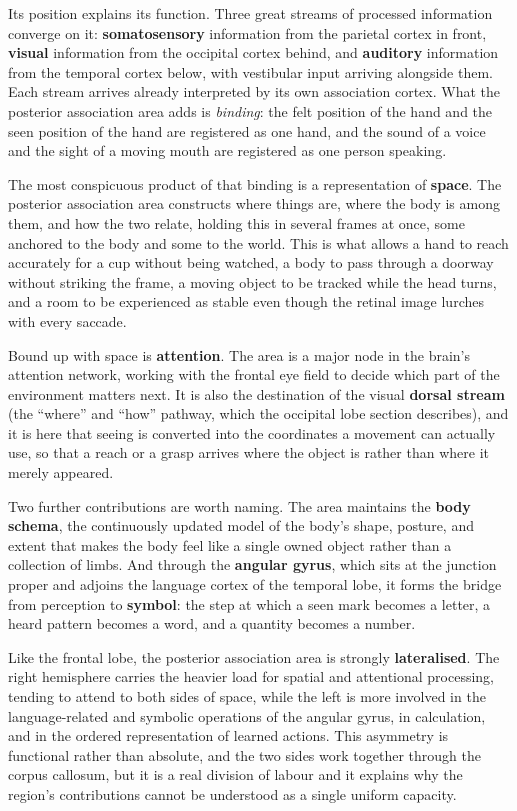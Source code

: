 \documentclass[11pt]{article}
\begin{document}
Its position explains its function. Three great streams of processed information converge on it: \textbf{somatosensory} information from the parietal cortex in front, \textbf{visual} information from the occipital cortex behind, and \textbf{auditory} information from the temporal cortex below, with vestibular input arriving alongside them. Each stream arrives already interpreted by its own association cortex. What the posterior association area adds is \textit{binding}: the felt position of the hand and the seen position of the hand are registered as one hand, and the sound of a voice and the sight of a moving mouth are registered as one person speaking.

The most conspicuous product of that binding is a representation of \textbf{space}. The posterior association area constructs where things are, where the body is among them, and how the two relate, holding this in several frames at once, some anchored to the body and some to the world. This is what allows a hand to reach accurately for a cup without being watched, a body to pass through a doorway without striking the frame, a moving object to be tracked while the head turns, and a room to be experienced as stable even though the retinal image lurches with every saccade.

Bound up with space is \textbf{attention}. The area is a major node in the brain's attention network, working with the frontal eye field to decide which part of the environment matters next. It is also the destination of the visual \textbf{dorsal stream} (the ``where'' and ``how'' pathway, which the occipital lobe section describes), and it is here that seeing is converted into the coordinates a movement can actually use, so that a reach or a grasp arrives where the object is rather than where it merely appeared.

Two further contributions are worth naming. The area maintains the \textbf{body schema}, the continuously updated model of the body's shape, posture, and extent that makes the body feel like a single owned object rather than a collection of limbs. And through the \textbf{angular gyrus}, which sits at the junction proper and adjoins the language cortex of the temporal lobe, it forms the bridge from perception to \textbf{symbol}: the step at which a seen mark becomes a letter, a heard pattern becomes a word, and a quantity becomes a number.

Like the frontal lobe, the posterior association area is strongly \textbf{lateralised}. The right hemisphere carries the heavier load for spatial and attentional processing, tending to attend to both sides of space, while the left is more involved in the language-related and symbolic operations of the angular gyrus, in calculation, and in the ordered representation of learned actions. This asymmetry is functional rather than absolute, and the two sides work together through the corpus callosum, but it is a real division of labour and it explains why the region's contributions cannot be understood as a single uniform capacity.
\end{document}
